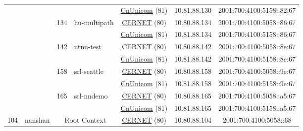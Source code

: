 \begin{small}
\begin{center}
\begin{longtable}{|c|c|c|c|c|c|c|c|}
  &  &  &  & \multicolumn{2}{|c|}{\tiny{\href{http://www.chinaunicom.com}{CnUnicom} (81)}} & \tiny{10.81.88.130} & \tiny{2001:700:4100:5158::82:67} \\* \cline{3-3}\cline{4-4}\cline{5-5}\cline{6-6}\cline{7-7}\cline{8-8}
  &  & \multirow{2}{*}{\tiny{134}} & \multicolumn{1}{|l|}{\multirow{2}{*}{\tiny{hu-multipath}}} & \multicolumn{2}{|c|}{\tiny{\href{http://www.cernet.edu.cn}{CERNET} (80)}} & \tiny{10.80.88.134} & \tiny{2001:700:4100:5058::86:67} \\* \cline{5-5}\cline{6-6}\cline{7-7}\cline{8-8}
  &  &  &  & \multicolumn{2}{|c|}{\tiny{\href{http://www.chinaunicom.com}{CnUnicom} (81)}} & \tiny{10.81.88.134} & \tiny{2001:700:4100:5158::86:67} \\* \cline{3-3}\cline{4-4}\cline{5-5}\cline{6-6}\cline{7-7}\cline{8-8}
  &  & \multirow{2}{*}{\tiny{142}} & \multicolumn{1}{|l|}{\multirow{2}{*}{\tiny{ntnu-test}}} & \multicolumn{2}{|c|}{\tiny{\href{http://www.cernet.edu.cn}{CERNET} (80)}} & \tiny{10.80.88.142} & \tiny{2001:700:4100:5058::8e:67} \\* \cline{5-5}\cline{6-6}\cline{7-7}\cline{8-8}
  &  &  &  & \multicolumn{2}{|c|}{\tiny{\href{http://www.chinaunicom.com}{CnUnicom} (81)}} & \tiny{10.81.88.142} & \tiny{2001:700:4100:5158::8e:67} \\* \cline{3-3}\cline{4-4}\cline{5-5}\cline{6-6}\cline{7-7}\cline{8-8}
  &  & \multirow{2}{*}{\tiny{158}} & \multicolumn{1}{|l|}{\multirow{2}{*}{\tiny{srl-seattle}}} & \multicolumn{2}{|c|}{\tiny{\href{http://www.cernet.edu.cn}{CERNET} (80)}} & \tiny{10.80.88.158} & \tiny{2001:700:4100:5058::9e:67} \\* \cline{5-5}\cline{6-6}\cline{7-7}\cline{8-8}
  &  &  &  & \multicolumn{2}{|c|}{\tiny{\href{http://www.chinaunicom.com}{CnUnicom} (81)}} & \tiny{10.81.88.158} & \tiny{2001:700:4100:5158::9e:67} \\* \cline{3-3}\cline{4-4}\cline{5-5}\cline{6-6}\cline{7-7}\cline{8-8}
  &  & \multirow{2}{*}{\tiny{165}} & \multicolumn{1}{|l|}{\multirow{2}{*}{\tiny{srl-nndemo}}} & \multicolumn{2}{|c|}{\tiny{\href{http://www.cernet.edu.cn}{CERNET} (80)}} & \tiny{10.80.88.165} & \tiny{2001:700:4100:5058::a5:67} \\* \cline{5-5}\cline{6-6}\cline{7-7}\cline{8-8}
  &  &  &  & \multicolumn{2}{|c|}{\tiny{\href{http://www.chinaunicom.com}{CnUnicom} (81)}} & \tiny{10.81.88.165} & \tiny{2001:700:4100:5158::a5:67} \\ \hline
 \multirow{20}{*}{\tiny{104}} & \multicolumn{1}{|l|}{\multirow{20}{*}{\tiny{nanshan}}} & \multicolumn{2}{|c|}{\multirow{2}{*}{\tiny{Root Context}}} & \multicolumn{2}{|c|}{\tiny{\href{http://www.cernet.edu.cn}{CERNET} (80)}} & \tiny{10.80.88.104} & \tiny{2001:700:4100:5058::68} \\* \cline{5-5}\cline{6-6}\cline{7-7}\cline{8-8}

\end{longtable}
\end{center}
\end{small}
